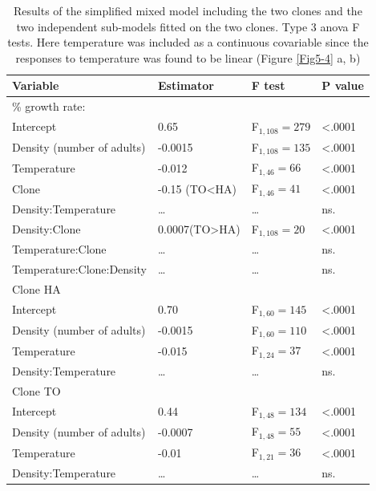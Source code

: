 \begin{table}[!h]
\centering
\caption{
 	Results of the simplified mixed model including the two
 	clones and the two independent sub-models fitted on the two clones. Type 3 anova F tests. Here
	temperature was included as a continuous covariable since the responses to
	temperature was found to be linear (Figure \ref{Fig5-4} a, b)
 	}\label{tab5-2}
\begin{tabular}{llll}
\hline
Variable & Estimator & F test & P value \\
 \hline \hline
\% growth rate: & & & \\
Intercept & 0.65 & F$_{1,108}=279$ & <.0001\\
Density (number of adults) & -0.0015 & F$_{1,108}=135$ & <.0001\\
Temperature & -0.012 & F$_{1,46}=66$ & <.0001\\
Clone & -0.15 (TO<HA) & F$_{1,46}=41$ & <.0001\\
Density:Temperature & \ldots & \ldots & ns.\\
Density:Clone & 0.0007(TO>HA) & F$_{1,108}=20$ & <.0001 \\
Temperature:Clone & \ldots & \ldots & ns.\\
Temperature:Clone:Density & \ldots & \ldots & ns. \\
\hline
Clone HA & & & \\
Intercept & 0.70 & F$_{1,60}=145$ & <.0001 \\
Density (number of adults) & -0.0015 & F$_{1,60}=110$ & <.0001\\
Temperature & -0.015 & F$_{1,24}=37$ & <.0001\\
Density:Temperature & \ldots & \ldots & ns. \\
\hline
Clone TO & & & \\
Intercept & 0.44 & F$_{1,48}=134$ & <.0001 \\
Density (number of adults) & -0.0007 & F$_{1,48}=55$ & <.0001\\
Temperature & -0.01 & F$_{1,21}=36$ & <.0001\\
Density:Temperature & \ldots & \ldots & ns.\\
\hline \hline
\end{tabular}

\end{table}

